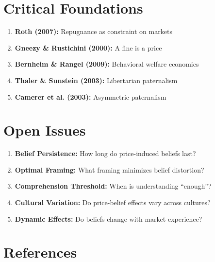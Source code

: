 \section{Critical Foundations}

\begin{enumerate}
    \item \textbf{Roth (2007):} Repugnance as constraint on markets
    \item \textbf{Gneezy \& Rustichini (2000):} A fine is a price
    \item \textbf{Bernheim \& Rangel (2009):} Behavioral welfare economics
    \item \textbf{Thaler \& Sunstein (2003):} Libertarian paternalism
    \item \textbf{Camerer et al. (2003):} Asymmetric paternalism
\end{enumerate}

\section{Open Issues}

\begin{enumerate}
    \item \textbf{Belief Persistence:} How long do price-induced beliefs last?
    \item \textbf{Optimal Framing:} What framing minimizes belief distortion?
    \item \textbf{Comprehension Threshold:} When is understanding ``enough''?
    \item \textbf{Cultural Variation:} Do price-belief effects vary across cultures?
    \item \textbf{Dynamic Effects:} Do beliefs change with market experience?
\end{enumerate}

\section{References}

